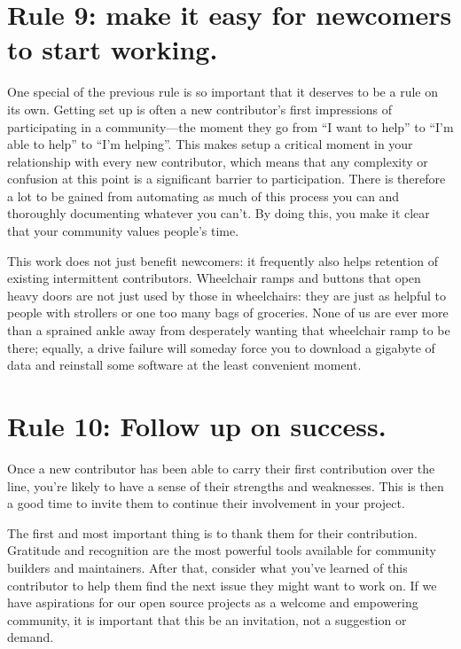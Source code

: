 \documentclass[10pt,letterpaper]{article}
\newcommand{\rulemajor}[1]{\section*{#1}}
\begin{document}
\rulemajor{Rule 9: make it easy for newcomers to start working.}

One special of the previous rule is so important that it deserves to be a rule on its own.
Getting set up is often a new contributor's first impressions of
participating in a community---the moment they go from ``I want to help''
to ``I'm able to help'' to ``I'm helping''.
This makes setup a critical moment in your relationship with every new contributor,
which means that any complexity or confusion at this point is a significant barrier to participation.
There is therefore a lot to be gained from automating as much of this process you can
and thoroughly documenting whatever you can't. 
By doing this,
you make it clear that your community values people's time.

This work does not just benefit newcomers:
it frequently also helps retention of existing intermittent contributors.
Wheelchair ramps and buttons that open heavy doors are not just used by those in wheelchairs:
they are just as helpful to people with strollers or one too many bags of groceries.
None of us are ever more than a sprained ankle away from desperately wanting that wheelchair ramp to be there;
equally,
a drive failure will someday force you to download a gigabyte of data
and reinstall some software
at the least convenient moment.

\rulemajor{Rule 10: Follow up on success.}

Once a new contributor has been able to carry their first contribution over the line, 
you're likely to have a sense of their strengths and weaknesses.
This is then a good time to invite them to continue their involvement in your project.

The first and most important thing is to thank them for their contribution.
Gratitude and recognition are the most powerful tools available for community builders and maintainers. 
After that,
consider what you've learned of this contributor to help them find
the next issue they might want to work on.
If we have aspirations for our open source projects as a welcome and empowering community,
it is important that this be an invitation,
not a suggestion or demand. 


\end{document}
